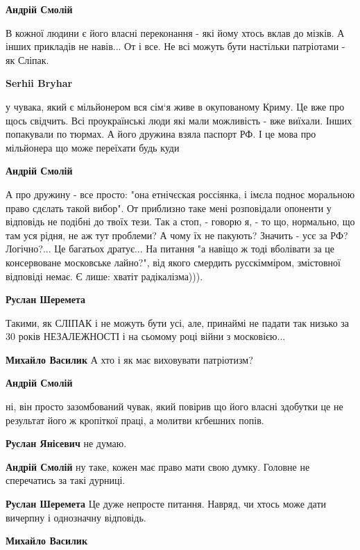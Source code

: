 \begin{itemize}
\begin{itemize}
\textbf{Андрій Смолій} 

В кожної людини є його власні переконання - які йому хтось вклав до мізків. А
інших прикладів не навів... От і все. Не всі можуть бути настільки патріотами -
як Сліпак.



\textbf{Serhii Bryhar} 

у чувака, який є мільйонером вся сім‘я живе в окупованому Криму. Це вже про
щось свідчить. Всі проукраїнські люди які мали можливість - вже виїхали. Інших
попакували по тюрмах. А його дружина взяла паспорт РФ. І це мова про мільйонера
що може переїхати будь куди

\textbf{Андрій Смолій} 

А про дружину - все просто: "она етнічєская россіянка, і імєла подноє моральною
право сдєлать такой вибор". От приблизно таке мені розповідали опоненти у
відповідь не подібні до твоїх тези. Так а стоп, - говорю я, - то що, нормально,
що там уся рідня, не аж тут проблеми? А чому їх не пакують? Значить - усє за
РФ? Логічно?... Це багатьох дратує... На питання "а навіщо ж тоді вболівати за
це консервоване московське лайно?", від якого смердить русскімміром, змістовної
відповіді немає. Є лише: хватіт радікалізма))).


\textbf{Руслан Шеремета}

Такими, як СЛІПАК і не можуть бути усі, але, принаймі не падати так низько за
30 років НЕЗАЛЕЖНОСТІ і на сьомому році війни з московією...


\textbf{Михайло Василик} А хто і як має виховувати патріотизм?

\textbf{Андрій Смолій} 

ні, він просто зазомбований чувак, який повірив що його власні здобутки це не
результат його ж кропіткої праці, а молитви кгбешних попів.



\textbf{Руслан Янісевич} не думаю.

\textbf{Андрій Смолій} ну таке, кожен має право мати свою думку. Головне не сперечатись за такі дурниці.

\textbf{Руслан Шеремета}
Це дуже непросте питання. Навряд, чи хтось може дати вичерпну і однозначну відповідь.

\textbf{Михайло Василик} 


\end{itemize}
\end{itemize}
